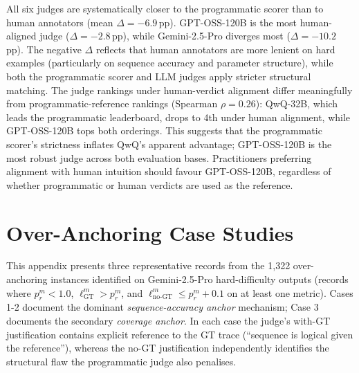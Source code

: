 All six judges are systematically closer to the programmatic scorer than to human annotators (mean $\Delta = -6.9$\,pp). GPT-OSS-120B is the most human-aligned judge ($\Delta = -2.8$\,pp), while Gemini-2.5-Pro diverges most ($\Delta = -10.2$\,pp). The negative $\Delta$ reflects that human annotators are more lenient on hard examples (particularly on sequence accuracy and parameter structure), while both the programmatic scorer and LLM judges apply stricter structural matching. The judge rankings under human-verdict alignment differ meaningfully from programmatic-reference rankings (Spearman $\rho = 0.26$): QwQ-32B, which leads the programmatic leaderboard, drops to 4th under human alignment, while GPT-OSS-120B tops both orderings. This suggests that the programmatic scorer's strictness inflates QwQ's apparent advantage; GPT-OSS-120B is the most robust judge across both evaluation bases. Practitioners preferring alignment with human intuition should favour GPT-OSS-120B, regardless of whether programmatic or human verdicts are used as the reference.

\section{Over-Anchoring Case Studies}
\label{app:anchoring-cases}

This appendix presents three representative records from the 1,322 over-anchoring instances identified on Gemini-2.5-Pro hard-difficulty outputs (records where $p^m_r < 1.0$, $\ell^m_{\text{GT}} > p^m_r$, and $\ell^m_{\text{no-GT}} \leq p^m_r + 0.1$ on at least one metric). Cases 1-2 document the dominant \emph{sequence-accuracy anchor} mechanism; Case 3 documents the secondary \emph{coverage anchor}. In each case the judge's with-GT justification contains explicit reference to the GT trace (``sequence is logical given the reference''), whereas the no-GT justification independently identifies the structural flaw the programmatic judge also penalises.

